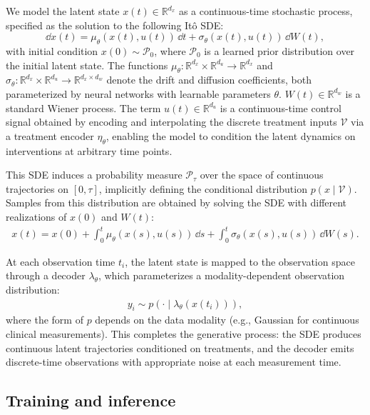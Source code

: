 \documentclass[preprint,12pt]{elsarticle}
\begin{document}
We model the latent state $x(t) \in \mathbb{R}^{d_x}$ as a continuous-time stochastic process, specified as the solution to the following It\^o SDE:
\begin{equation}
    \dd x(t) = \mu_\theta(x(t), u(t))\,\dd t + \sigma_\theta(x(t), u(t))\,\dd W(t),
    \label{eq:ito_sde}
\end{equation}
with initial condition $x(0) \sim \mathcal{P}_0$, where $\mathcal{P}_0$ is a learned prior distribution over the initial latent state. The functions $\mu_\theta: \mathbb{R}^{d_x} \times \mathbb{R}^{d_u} \to \mathbb{R}^{d_x}$ and $\sigma_\theta: \mathbb{R}^{d_x} \times \mathbb{R}^{d_u} \to \mathbb{R}^{d_x \times d_w}$ denote the drift and diffusion coefficients, both parameterized by neural networks with learnable parameters $\theta$. $W(t) \in \mathbb{R}^{d_w}$ is a standard Wiener process. The term $u(t) \in \mathbb{R}^{d_u}$ is a continuous-time control signal obtained by encoding and interpolating the discrete treatment inputs $\mathcal{V}$ via a treatment encoder $\eta_\theta$, enabling the model to condition the latent dynamics on interventions at arbitrary time points.

This SDE induces a probability measure $\mathcal{P}_\tau$ over the space of continuous trajectories on $[0, \tau]$, implicitly defining the conditional distribution $p(x \mid \mathcal{V})$. Samples from this distribution are obtained by solving the SDE with different realizations of $x(0)$ and $W(t)$:
\begin{align}
    x(t) = x(0) + \int_0^t \mu_\theta(x(s), u(s))\,\dd s + \int_0^t \sigma_\theta(x(s), u(s))\,\dd W(s).
    \label{eq:sde_integral}
\end{align}

At each observation time $t_i$, the latent state is mapped to the observation space through a decoder $\lambda_\theta$, which parameterizes a modality-dependent observation distribution:
\begin{align}
    y_i \sim p\left(\cdot \mid \lambda_\theta(x(t_i))\right),
    \label{eq:obs_model}
\end{align}
where the form of $p$ depends on the data modality (e.g., Gaussian for continuous clinical measurements). This completes the generative process: the SDE produces continuous latent trajectories conditioned on treatments, and the decoder emits discrete-time observations with appropriate noise at each measurement time.
\subsection{Training and inference}
\label{sec:training_inference}
\end{document}

